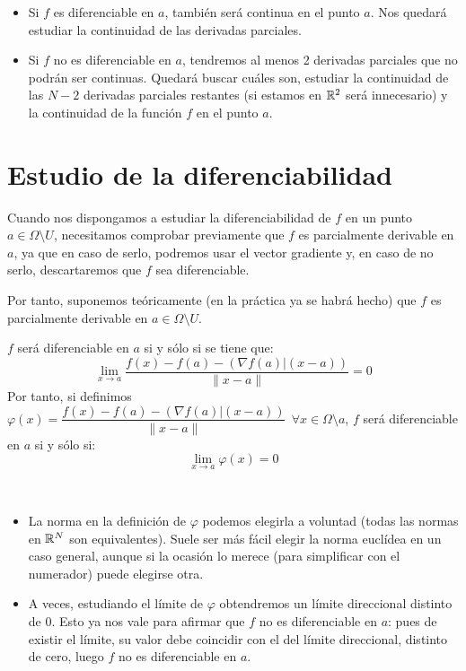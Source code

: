 \begin{itemize}
    \item Si $f$ es diferenciable en $a$, también será continua en el punto $a$. Nos quedará estudiar la continuidad de las derivadas parciales.
    \item Si $f$ no es diferenciable en $a$, tendremos al menos 2 derivadas parciales que no podrán ser continuas. Quedará buscar cuáles son, estudiar la continuidad de las $N-2$ derivadas parciales restantes (si estamos en $\mathbb R^2$ será innecesario) y la continuidad de la función $f$ en el punto $a$.
\end{itemize}

\section{Estudio de la diferenciabilidad}
\noindent
Cuando nos dispongamos a estudiar la diferenciabilidad de $f$ en un punto $a\in \Omega \setminus U$, necesitamos comprobar previamente que $f$ es parcialmente derivable en $a$, ya que en caso de serlo, podremos usar el vector gradiente y, en caso de no serlo, descartaremos que $f$ sea diferenciable.
\vspace{.5cm}

\noindent
Por tanto, suponemos teóricamente (en la práctica ya se habrá hecho) que $f$ es parcialmente derivable en $a \in \Omega \setminus U$.
\vspace{.5cm}

$f$ será diferenciable en $a$ si y sólo si se tiene que:
$$\lim_{x \to a} \dfrac{f(x) - f(a) - \left(\nabla f(a)|(x-a)\right)}{\|x-a\|}=0$$
Por tanto, si definimos $\varphi(x) = \dfrac{f(x) - f(a) - \left(\nabla f(a)|(x-a)\right)}{\|x-a\|}~~\forall x \in \Omega \setminus {a}$, $f$ será diferenciable en $a$ si y sólo si:
$$\lim_{x \to a} \varphi(x) = 0$$

\begin{observacion}
\ \\
    \begin{itemize}
        \item La norma en la definición de $\varphi$ podemos elegirla a voluntad (todas las normas en $\mathbb R^N$ son equivalentes). Suele ser más fácil elegir la norma euclídea en un caso general, aunque si la ocasión lo merece (para simplificar con el numerador) puede elegirse otra.
        \item A veces, estudiando el límite de $\varphi$ obtendremos un límite direccional distinto de 0. Esto ya nos vale para afirmar que $f$ no es diferenciable en $a$: pues de existir el límite, su valor debe coincidir con el del límite direccional, distinto de cero, luego $f$ no es diferenciable en $a$.
    \end{itemize}
\end{observacion}

